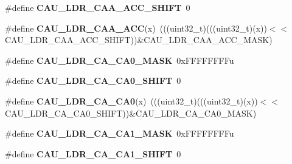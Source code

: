 \begin{DoxyCompactItemize}
\item 
\#define {\bfseries C\+A\+U\+\_\+\+L\+D\+R\+\_\+\+C\+A\+A\+\_\+\+A\+C\+C\+\_\+\+S\+H\+I\+FT}~0\hypertarget{group__CAU__Register__Masks_ga3d0a4b449aa40e73d9ef6540832fec08}{}\label{group__CAU__Register__Masks_ga3d0a4b449aa40e73d9ef6540832fec08}

\item 
\#define {\bfseries C\+A\+U\+\_\+\+L\+D\+R\+\_\+\+C\+A\+A\+\_\+\+A\+CC}(x)~(((uint32\+\_\+t)(((uint32\+\_\+t)(x))$<$$<$C\+A\+U\+\_\+\+L\+D\+R\+\_\+\+C\+A\+A\+\_\+\+A\+C\+C\+\_\+\+S\+H\+I\+FT))\&C\+A\+U\+\_\+\+L\+D\+R\+\_\+\+C\+A\+A\+\_\+\+A\+C\+C\+\_\+\+M\+A\+SK)\hypertarget{group__CAU__Register__Masks_ga4a805225201daa70b2aa5c3d47634361}{}\label{group__CAU__Register__Masks_ga4a805225201daa70b2aa5c3d47634361}

\item 
\#define {\bfseries C\+A\+U\+\_\+\+L\+D\+R\+\_\+\+C\+A\+\_\+\+C\+A0\+\_\+\+M\+A\+SK}~0x\+F\+F\+F\+F\+F\+F\+F\+Fu\hypertarget{group__CAU__Register__Masks_ga15ab69e214b180e4459b220f28db6671}{}\label{group__CAU__Register__Masks_ga15ab69e214b180e4459b220f28db6671}

\item 
\#define {\bfseries C\+A\+U\+\_\+\+L\+D\+R\+\_\+\+C\+A\+\_\+\+C\+A0\+\_\+\+S\+H\+I\+FT}~0\hypertarget{group__CAU__Register__Masks_ga3f71ad6211265982fcdc2aa519a357c7}{}\label{group__CAU__Register__Masks_ga3f71ad6211265982fcdc2aa519a357c7}

\item 
\#define {\bfseries C\+A\+U\+\_\+\+L\+D\+R\+\_\+\+C\+A\+\_\+\+C\+A0}(x)~(((uint32\+\_\+t)(((uint32\+\_\+t)(x))$<$$<$C\+A\+U\+\_\+\+L\+D\+R\+\_\+\+C\+A\+\_\+\+C\+A0\+\_\+\+S\+H\+I\+FT))\&C\+A\+U\+\_\+\+L\+D\+R\+\_\+\+C\+A\+\_\+\+C\+A0\+\_\+\+M\+A\+SK)\hypertarget{group__CAU__Register__Masks_gadf71509a7bc1b885aa95d7adf16ffc3d}{}\label{group__CAU__Register__Masks_gadf71509a7bc1b885aa95d7adf16ffc3d}

\item 
\#define {\bfseries C\+A\+U\+\_\+\+L\+D\+R\+\_\+\+C\+A\+\_\+\+C\+A1\+\_\+\+M\+A\+SK}~0x\+F\+F\+F\+F\+F\+F\+F\+Fu\hypertarget{group__CAU__Register__Masks_ga5dac734b52c32cbb41f3daafa6d85e9e}{}\label{group__CAU__Register__Masks_ga5dac734b52c32cbb41f3daafa6d85e9e}

\item 
\#define {\bfseries C\+A\+U\+\_\+\+L\+D\+R\+\_\+\+C\+A\+\_\+\+C\+A1\+\_\+\+S\+H\+I\+FT}~0\hypertarget{group__CAU__Register__Masks_ga7c6e3a6f8d94f1b39d9f6334d6916b64}{}\label{group__CAU__Register__Masks_ga7c6e3a6f8d94f1b39d9f6334d6916b64}


\end{DoxyCompactItemize}
